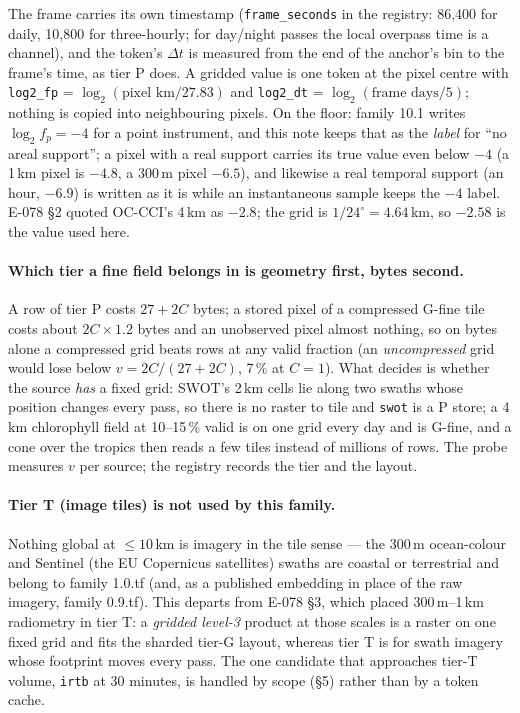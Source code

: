 \documentclass[10pt]{article}
\newcommand{\code}[1]{\texttt{#1}}
\begin{document}
The frame carries its own timestamp (\code{frame\_seconds} in the registry:
86,400 for daily, 10,800 for three-hourly; for day/night passes the local
overpass time is a channel), and the token's $\Delta t$ is measured from the
end of the anchor's bin to the frame's time, as tier P does. A gridded value is
one token at the pixel centre with \code{log2\_fp} = $\log_2(\text{pixel km} /
27.83)$ and \code{log2\_dt} = $\log_2(\text{frame days} / 5)$; nothing is
copied into neighbouring pixels. On the floor: family 10.1 writes
$\log_2 f_p = -4$ for a point instrument, and this note keeps that as the
\emph{label} for ``no areal support''; a pixel with a real support carries
its true value even below $-4$ (a 1\,km pixel is $-4.8$, a 300\,m pixel
$-6.5$), and likewise a real temporal support (an hour, $-6.9$) is written
as it is while an instantaneous sample keeps the $-4$ label. E-078 \S2
quoted OC-CCI's 4\,km as $-2.8$; the grid is $1/24^\circ = 4.64$\,km, so
$-2.58$ is the value used here.

\paragraph{Which tier a fine field belongs in is geometry first, bytes
second.} A row of tier P costs $27 + 2C$ bytes; a stored pixel of a
compressed G-fine tile costs about $2C \times 1.2$ bytes and an unobserved
pixel almost nothing, so on bytes alone a compressed grid beats rows at any
valid fraction (an \emph{uncompressed} grid would lose below
$v = 2C/(27 + 2C)$, 7\,\% at $C = 1$). What decides is whether the source
\emph{has} a fixed grid: SWOT's 2\,km cells lie along two swaths whose
position changes every pass, so there is no raster to tile and \code{swot} is
a P store; a 4\,km chlorophyll field at 10--15\,\% valid is on one grid every
day and is G-fine, and a cone over the tropics then reads a few tiles instead
of millions of rows. The probe measures $v$ per source; the registry records
the tier and the layout.

\paragraph{Tier T (image tiles) is not used by this family.} Nothing global at
$\le 10$\,km is imagery in the tile sense --- the 300\,m ocean-colour and
Sentinel (the EU Copernicus satellites) swaths are coastal or terrestrial and belong to family 1.0.tf (and, as a published embedding in place of the raw imagery, family 0.9.tf). This
departs from E-078 \S3, which placed 300\,m--1\,km radiometry in tier T: a
\emph{gridded level-3} product at those scales is a raster on one fixed grid
and fits the sharded tier-G layout, whereas tier T is for swath imagery whose
footprint moves every pass. The one
candidate that approaches tier-T volume, \code{irtb} at 30 minutes, is handled
by scope (\S5) rather than by a token cache.
\end{document}
